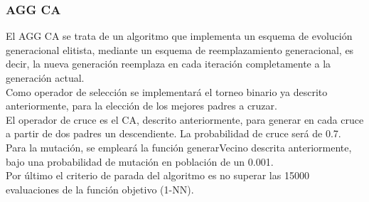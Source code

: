 \subsubsection{AGG CA}
El AGG CA se trata de un algoritmo que implementa un esquema de evolución generacional elitista, mediante un esquema de reemplazamiento generacional, es decir, la nueva generación reemplaza en cada iteración completamente a la generación actual.\\ 
Como operador de selección se implementará el torneo binario ya descrito anteriormente, para la elección de los mejores padres a cruzar.\\ 

El operador de cruce es el CA, descrito anteriormente, para generar en cada cruce a partir de dos padres un descendiente. La probabilidad de cruce será de 0.7.\\ 

Para la mutación, se empleará la función generarVecino descrita anteriormente, bajo una probabilidad de mutación en población de un 0.001.\\ 

Por último el criterio de parada del algoritmo es no superar las 15000 evaluaciones de la función objetivo (1-NN).


